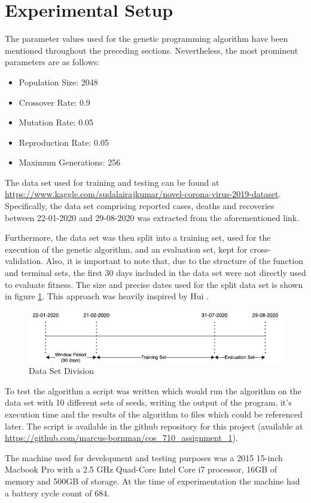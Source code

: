 \section{Experimental Setup}
The parameter values used for the genetic programming algorithm have been mentioned throughout the preceding sections. Nevertheless, the most prominent parameters are as follows:

\begin{itemize}
    \item Population Size: 2048
    \item Crossover Rate: 0.9
    \item Mutation Rate: 0.05
    \item Reproduction Rate: 0.05
    \item Maximum Generations: 256
\end{itemize}

The data set used for training and testing can be found at \url{https://www.kaggle.com/sudalairajkumar/novel-corona-virus-2019-dataset}. Specifically, the data set comprising reported cases, deaths and recoveries between 22-01-2020 and 29-08-2020 was extracted from the aforementioned link. 

Furthermore, the data set was then split into a training set, used for the execution of the genetic algorithm, and an evaluation set, kept for cross-validation. Also, it is important to note that, due to the structure of the function and terminal sets, the first 30 days included in the data set were not directly used to evaluate fitness. The size and precise dates used for the split data set is shown in figure \ref{fig:data_sets}. This approach was heavily inspired by Hui \cite{hui2003using}.

\begin{figure}[H]
\centering
\includegraphics[width=\textwidth]{report/8_experimental_setup/data_sets.png}
\caption{Data Set Division}
\label{fig:data_sets}
\end{figure}

To test the algorithm a script was written which would run the algorithm on the data set with 10 different sets of seeds, writing the output of the program, it's execution time and the results of the algorithm to files which could be referenced later. The script is available in the github repository for this project (available at \url{https://github.com/marcus-bornman/cos_710_assignment_1}).

The machine used for development and testing purposes was a 2015 15-inch Macbook Pro with a 2.5 GHz Quad-Core Intel Core i7 processor, 16GB of memory and 500GB of storage. At the time of experimentation the machine had a battery cycle count of 684.